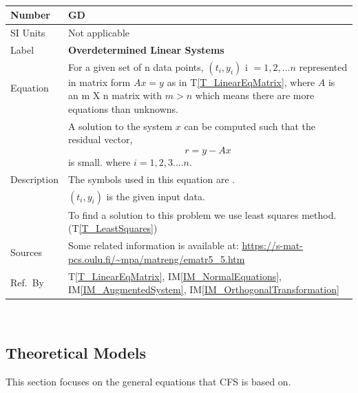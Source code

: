 \documentclass[12pt]{article}
\newcommand{\colAwidth}{0.13\textwidth}
\newcommand{\colBwidth}{0.82\textwidth}
\newcounter{defnum} %
\newcommand{\tref}[1]{T\ref{#1}}
\newcommand{\iref}[1]{IM\ref{#1}}
\newcommand{\famname}{CFS} %
\begin{document}
~\newline
\noindent
\begin{minipage}{\textwidth}
	\renewcommand*{\arraystretch}{1.5}
	\begin{tabular}{| p{\colAwidth} | p{\colBwidth}|}
		\hline
		\rowcolor[gray]{0.9}
		Number& GD{defnum}\thedefnum
		\label{GD_OverdetLinearSys}\\
		\hline
		SI Units& Not applicable\\
		\hline
		Label & \bf Overdetermined Linear Systems\\
		\hline
		Equation
		& For a given set of n data points, $(t_i,y_i)$ i $= {1,2,...n}$ represented in matrix form $Ax = y$ as in \tref{T_LinearEqMatrix}, where $A$ is an m X n matrix with $m > n$ which means there are more equations than unknowns. \\		
		& A solution to the system $x$ can be computed such that the residual vector,
		\begin{equation*}
		r = y - Ax
		\end{equation*} is small. 
		where $i = 1,2,3 ....n$.\\
		\hline
		
		Description 
		& The symbols used in this equation are .\\
		& $(t_i,y_i)$ is the given input data.\\
		& To find a solution to this problem we use least squares method.(\tref{T_LeastSquares})\\
		\hline
		
		Sources& Some related information is available at:
		\url{https://s-mat-pcs.oulu.fi/~mpa/matreng/ematr5_5.htm}\\
		\hline
		Ref.\ By & \tref{T_LinearEqMatrix}, \iref{IM_NormalEquations}, \iref{IM_AugmentedSystem}, \iref{IM_OrthogonalTransformation}\\
		\hline
	\end{tabular}
\end{minipage}\\

\subsection{Theoretical Models} \label{sec_theoretical}

This section focuses on the general equations that \famname{} is based on.
~\newline
\end{document}
